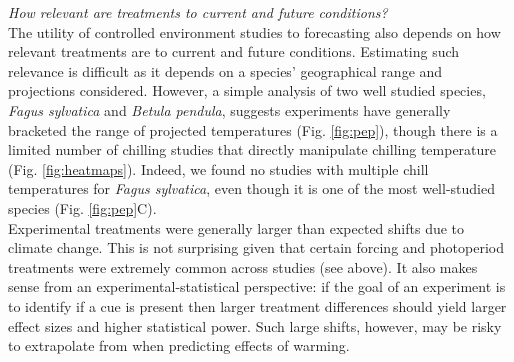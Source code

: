 \documentclass[11pt,letter]{article}
\begin{document}
\emph{How relevant are treatments to current and future conditions?}\\
The utility of controlled environment studies to forecasting also depends on how relevant treatments are to current and future conditions. Estimating such relevance is difficult as it depends on a species' geographical range and projections considered. However, a simple analysis of two well studied species, \emph{Fagus sylvatica} and \emph{Betula pendula}, suggests experiments have generally bracketed the range of projected temperatures (Fig. \ref{fig:pep}), though there is a limited number of chilling studies that directly manipulate chilling temperature (Fig. \ref{fig:heatmaps}). Indeed, we found no studies with multiple chill temperatures for \emph{Fagus sylvatica}, even though it is one of the most well-studied species (Fig. \ref{fig:pep}C). \\ %

Experimental treatments were generally larger than expected shifts due to climate change. This is not surprising given that certain forcing and photoperiod treatments were extremely common across studies (see above). It also makes sense from an experimental-statistical perspective: if the goal of an experiment is to identify if a cue is present then larger treatment differences should yield larger effect sizes and higher statistical power. Such large shifts, however, may be risky to extrapolate from when predicting effects of warming.   %
\end{document}

